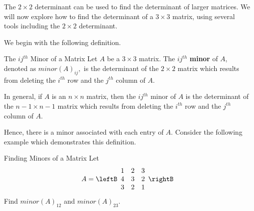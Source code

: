 The $2 \times 2$ determinant can be used to find the determinant of larger matrices.
We will now explore how to find the determinant of a $3 \times 3$ matrix, using several tools
including the $2 \times 2$ determinant.

We begin with the following definition. 

\begin{definition}{The $ij^{th}$ Minor of a Matrix}\label{def:ijthminor}
Let $A$ be a $3\times 3$ matrix. The $ij^{th}$ \textbf{minor} of $A$, denoted as
 $minor\left( A\right) _{ij},$ is the determinant
of the $2\times 2$ matrix which results from deleting the $i^{th}$ row and
the $j^{th}$ column of $A$.

In general, if $A$ is an $n\times n$ matrix, then the $ij^{th}$ minor of $A$ is the determinant of the $n-1 \times n-1$ matrix which results from deleting the $i^{th}$ row and the $j^{th}$ column of $A$. 
\end{definition}

Hence, there is a minor associated with each entry of $A$. Consider the following example which demonstrates this definition. 

\begin{example}{Finding Minors of a Matrix}\label{exa:findingminors}
Let 
\begin{equation*}
A = \leftB
\begin{array}{rrr}
1 & 2 & 3 \\
4 & 3 & 2 \\
3 & 2 & 1
\end{array}
\rightB 
\end{equation*}
Find $minor\left( A\right) _{12}$ and $minor\left( A\right) _{23}$.
\end{example}

